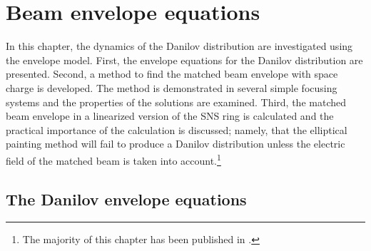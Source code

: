 \chapter{Beam envelope equations} \label{chap-2}

In this chapter, the dynamics of the Danilov distribution are investigated using the envelope model. First, the envelope equations for the Danilov distribution are presented. Second, a method to find the matched beam envelope with space charge is developed. The method is demonstrated in several simple focusing systems and the properties of the solutions are examined. Third, the matched beam envelope in a linearized version of the SNS ring is calculated and the practical importance of the calculation is discussed; namely, that the elliptical painting method will fail to produce a Danilov distribution unless the electric field of the matched beam is taken into account.\footnote{The majority of this chapter has been published in \cite{Hoover2021}.}


\section{The Danilov envelope equations}

